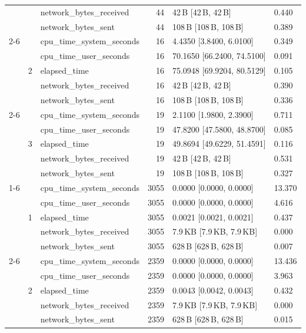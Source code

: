 \begin{tabular}{lllrll}
 &  & network_bytes_received & 44 & 42\,B [42\,B, 42\,B] & 0.440 \\
 &  & network_bytes_sent & 44 & 108\,B [108\,B, 108\,B] & 0.389 \\
\cline{2-6}
 & \multirow[t]{5}{*}{2} & cpu_time_system_seconds & 16 & 4.4350 [3.8400, 6.0100] & 0.349 \\
 &  & cpu_time_user_seconds & 16 & 70.1650 [66.2400, 74.5100] & 0.091 \\
 &  & elapsed_time & 16 & 75.0948 [69.9204, 80.5129] & 0.105 \\
 &  & network_bytes_received & 16 & 42\,B [42\,B, 42\,B] & 0.390 \\
 &  & network_bytes_sent & 16 & 108\,B [108\,B, 108\,B] & 0.336 \\
\cline{2-6}
 & \multirow[t]{5}{*}{3} & cpu_time_system_seconds & 19 & 2.1100 [1.9800, 2.3900] & 0.711 \\
 &  & cpu_time_user_seconds & 19 & 47.8200 [47.5800, 48.8700] & 0.085 \\
 &  & elapsed_time & 19 & 49.8694 [49.6229, 51.4591] & 0.116 \\
 &  & network_bytes_received & 19 & 42\,B [42\,B, 42\,B] & 0.531 \\
 &  & network_bytes_sent & 19 & 108\,B [108\,B, 108\,B] & 0.327 \\
\cline{1-6} \cline{2-6}
\multirow[t]{15}{*}{knn-search-postgis-large} & \multirow[t]{5}{*}{1} & cpu_time_system_seconds & 3055 & 0.0000 [0.0000, 0.0000] & 13.370 \\
 &  & cpu_time_user_seconds & 3055 & 0.0000 [0.0000, 0.0000] & 4.616 \\
 &  & elapsed_time & 3055 & 0.0021 [0.0021, 0.0021] & 0.437 \\
 &  & network_bytes_received & 3055 & 7.9\,KB [7.9\,KB, 7.9\,KB] & 0.000 \\
 &  & network_bytes_sent & 3055 & 628\,B [628\,B, 628\,B] & 0.007 \\
\cline{2-6}
 & \multirow[t]{5}{*}{2} & cpu_time_system_seconds & 2359 & 0.0000 [0.0000, 0.0000] & 13.436 \\
 &  & cpu_time_user_seconds & 2359 & 0.0000 [0.0000, 0.0000] & 3.963 \\
 &  & elapsed_time & 2359 & 0.0043 [0.0042, 0.0043] & 0.432 \\
 &  & network_bytes_received & 2359 & 7.9\,KB [7.9\,KB, 7.9\,KB] & 0.000 \\
 &  & network_bytes_sent & 2359 & 628\,B [628\,B, 628\,B] & 0.015 \\

\end{tabular}
